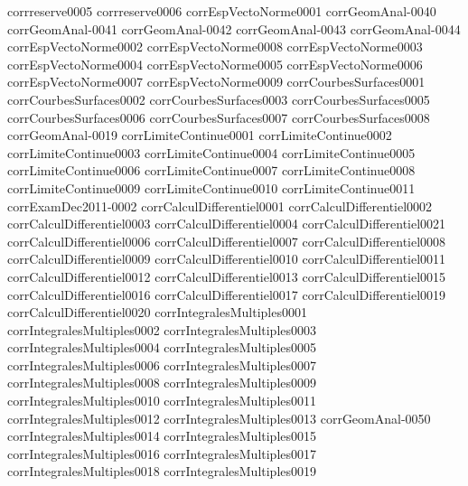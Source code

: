 {corrreserve0005}
{corrreserve0006}
{corrEspVectoNorme0001}
{corrGeomAnal-0040}
{corrGeomAnal-0041}
{corrGeomAnal-0042}
{corrGeomAnal-0043}
{corrGeomAnal-0044}
{corrEspVectoNorme0002}
{corrEspVectoNorme0008}
{corrEspVectoNorme0003}
{corrEspVectoNorme0004}
{corrEspVectoNorme0005}
{corrEspVectoNorme0006}
{corrEspVectoNorme0007}
{corrEspVectoNorme0009}
{corrCourbesSurfaces0001}
{corrCourbesSurfaces0002}
{corrCourbesSurfaces0003}
{corrCourbesSurfaces0005}
{corrCourbesSurfaces0006}
{corrCourbesSurfaces0007}
{corrCourbesSurfaces0008}
{corrGeomAnal-0019}
{corrLimiteContinue0001}
{corrLimiteContinue0002}
{corrLimiteContinue0003}
{corrLimiteContinue0004}
{corrLimiteContinue0005}
{corrLimiteContinue0006}
{corrLimiteContinue0007}
{corrLimiteContinue0008}
{corrLimiteContinue0009}
{corrLimiteContinue0010}
{corrLimiteContinue0011}
{corrExamDec2011-0002}
{corrCalculDifferentiel0001}
{corrCalculDifferentiel0002}
{corrCalculDifferentiel0003}
{corrCalculDifferentiel0004}
{corrCalculDifferentiel0021}
{corrCalculDifferentiel0006}
{corrCalculDifferentiel0007}
{corrCalculDifferentiel0008}
{corrCalculDifferentiel0009}
{corrCalculDifferentiel0010}
{corrCalculDifferentiel0011}
{corrCalculDifferentiel0012}
{corrCalculDifferentiel0013}
{corrCalculDifferentiel0015}
{corrCalculDifferentiel0016}
{corrCalculDifferentiel0017}
{corrCalculDifferentiel0019}
{corrCalculDifferentiel0020}
{corrIntegralesMultiples0001}
{corrIntegralesMultiples0002}
{corrIntegralesMultiples0003}
{corrIntegralesMultiples0004}
{corrIntegralesMultiples0005}
{corrIntegralesMultiples0006}
{corrIntegralesMultiples0007}
{corrIntegralesMultiples0008}
{corrIntegralesMultiples0009}
{corrIntegralesMultiples0010}
{corrIntegralesMultiples0011}
{corrIntegralesMultiples0012}
{corrIntegralesMultiples0013}
{corrGeomAnal-0050}
{corrIntegralesMultiples0014}
{corrIntegralesMultiples0015}
{corrIntegralesMultiples0016}
{corrIntegralesMultiples0017}
{corrIntegralesMultiples0018}
{corrIntegralesMultiples0019}
